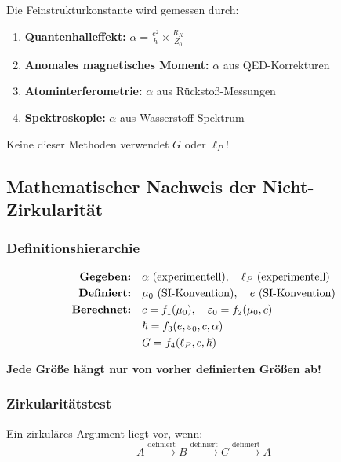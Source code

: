 	Die Feinstrukturkonstante wird gemessen durch:
	
	\begin{enumerate}
		\item \textbf{Quantenhalleffekt:} $\alpha = \frac{e^2}{h} \times \frac{R_K}{Z_0}$
		\item \textbf{Anomales magnetisches Moment:} $\alpha$ aus QED-Korrekturen
		\item \textbf{Atominterferometrie:} $\alpha$ aus Rückstoß{}-Messungen
		\item \textbf{Spektroskopie:} $\alpha$ aus Wasserstoff-Spektrum
	\end{enumerate}
	
	Keine dieser Methoden verwendet $G$ oder $\ell_P$!
	
	\subsection{Mathematischer Nachweis der Nicht-Zirkularität}
	
	\subsubsection{Definitionshierarchie}
	
	\begin{align}
		\text{\textbf{Gegeben:}} &\quad \alpha \text{ (experimentell)}, \quad \ell_P \text{ (experimentell)}\\
		\text{\textbf{Definiert:}} &\quad \mu_0 \text{ (SI-Konvention)}, \quad e \text{ (SI-Konvention)}\\
		\text{\textbf{Berechnet:}} &\quad c = f_1(\mu_0), \quad \varepsilon_0 = f_2(\mu_0, c)\\
		&\quad \hbar = f_3(e, \varepsilon_0, c, \alpha)\\
		&\quad G = f_4(\ell_P, c, \hbar)
	\end{align}
	
	\textbf{Jede Größ{}e hängt nur von vorher definierten Größ{}en ab!}
	
	\subsubsection{Zirkularitätstest}
	
	Ein zirkuläres Argument liegt vor, wenn:
	\begin{equation}
		A \xrightarrow{\text{definiert}} B \xrightarrow{\text{definiert}} C \xrightarrow{\text{definiert}} A
	\end{equation}
	
